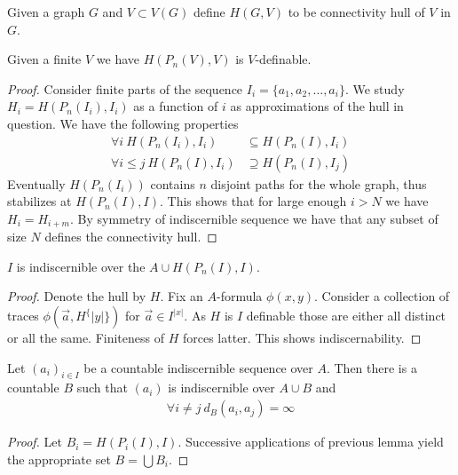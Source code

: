 \documentclass{amsart}
\begin{document}
\begin{Definition}
	Given a graph $G$ and $V \subset V(G)$ define $H(G, V)$ to be connectivity hull of $V$ in $G$.
\end{Definition}

\begin{Note}
	Given a finite $V$ we have $H(P_n(V), V)$ is $V$-definable.
\end{Note}

\begin{proof}
	Consider finite parts of the sequence $I_i = \{a_1, a_2, \ldots, a_i\}$. We study $H_i = H(P_n(I_i), I_i)$ as a function of $i$ as approximations of the hull in question. We have the following properties
	\begin{align*}
		 \forall i \ H(P_n(I_i), I_i) &\subseteq H(P_n(I), I_i) \\
		 \forall i \leq j \ H(P_n(I), I_i) &\supseteq H(P_n(I), I_j)
	\end{align*}
		Eventually $H(P_n(I_i))$ contains $n$ disjoint paths for the whole graph, thus stabilizes at $H(P_n(I), I)$. This shows that for large enough $i>N$ we have $H_i = H_{i+m}$. By symmetry of indiscernible sequence we have that any subset of size $N$ defines the connectivity hull.
\end{proof}

\begin{Lemma}
	$I$ is indiscernible over the $A \cup H(P_n(I), I)$.
\end{Lemma}

\begin{proof}
	Denote the hull by $H$. Fix an $A$-formula $\phi(x,y)$. Consider a collection of traces $\phi(\vec a, H^\{|y|\})$ for $\vec a \in I^{|x|}$. As $H$ is $I$ definable those are either all distinct or all the same. Finiteness of $H$ forces latter. This shows indiscernability.
\end{proof}

\begin{Corollary}
	Let $(a_i)_{i \in I}$ be a countable indiscernible sequence over $A$. Then there is a countable $B$ such that  $(a_i)$ is indiscernible over $A \cup B$ and
	\begin{align*}
		\forall i \neq j \ d_B(a_i, a_j) = \infty
	\end{align*}
\end{Corollary}

\begin{proof}
	Let $B_i = H(P_i(I), I)$. Successive applications of previous lemma yield the appropriate set $B = \bigcup B_i$.
\end{proof}
\end{document}
